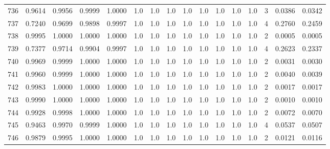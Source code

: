 \begin{tabular}{lrrrrrrrrrrrrrrr}
736 &      0.9614 &  0.9956 &  0.9999 &  1.0000 &     1.0 &     1.0 &     1.0 &     1.0 &     1.0 &     1.0 &      1.0 &        1.0 &      3 &                    0.0386 &                     0.0342 \\
737 &      0.7240 &  0.9699 &  0.9898 &  0.9997 &     1.0 &     1.0 &     1.0 &     1.0 &     1.0 &     1.0 &      1.0 &        1.0 &      4 &                    0.2760 &                     0.2459 \\
738 &      0.9995 &  1.0000 &  1.0000 &  1.0000 &     1.0 &     1.0 &     1.0 &     1.0 &     1.0 &     1.0 &      1.0 &        1.0 &      2 &                    0.0005 &                     0.0005 \\
739 &      0.7377 &  0.9714 &  0.9904 &  0.9997 &     1.0 &     1.0 &     1.0 &     1.0 &     1.0 &     1.0 &      1.0 &        1.0 &      4 &                    0.2623 &                     0.2337 \\
740 &      0.9969 &  0.9999 &  1.0000 &  1.0000 &     1.0 &     1.0 &     1.0 &     1.0 &     1.0 &     1.0 &      1.0 &        1.0 &      2 &                    0.0031 &                     0.0030 \\
741 &      0.9960 &  0.9999 &  1.0000 &  1.0000 &     1.0 &     1.0 &     1.0 &     1.0 &     1.0 &     1.0 &      1.0 &        1.0 &      2 &                    0.0040 &                     0.0039 \\
742 &      0.9983 &  1.0000 &  1.0000 &  1.0000 &     1.0 &     1.0 &     1.0 &     1.0 &     1.0 &     1.0 &      1.0 &        1.0 &      2 &                    0.0017 &                     0.0017 \\
743 &      0.9990 &  1.0000 &  1.0000 &  1.0000 &     1.0 &     1.0 &     1.0 &     1.0 &     1.0 &     1.0 &      1.0 &        1.0 &      2 &                    0.0010 &                     0.0010 \\
744 &      0.9928 &  0.9998 &  1.0000 &  1.0000 &     1.0 &     1.0 &     1.0 &     1.0 &     1.0 &     1.0 &      1.0 &        1.0 &      2 &                    0.0072 &                     0.0070 \\
745 &      0.9463 &  0.9970 &  0.9999 &  1.0000 &     1.0 &     1.0 &     1.0 &     1.0 &     1.0 &     1.0 &      1.0 &        1.0 &      4 &                    0.0537 &                     0.0507 \\
746 &      0.9879 &  0.9995 &  1.0000 &  1.0000 &     1.0 &     1.0 &     1.0 &     1.0 &     1.0 &     1.0 &      1.0 &        1.0 &      2 &                    0.0121 &                     0.0116 \\

\end{tabular}
